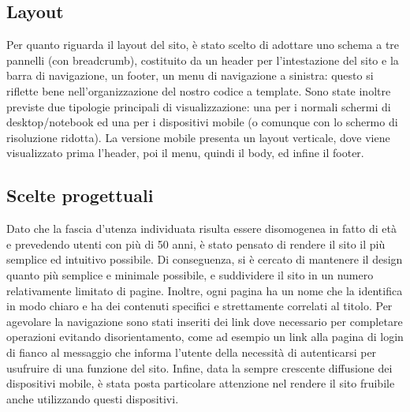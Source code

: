 \subsection{Layout}
Per quanto riguarda il layout del sito, è stato scelto di adottare uno schema a tre pannelli (con breadcrumb), costituito da un header per l’intestazione del sito e la barra di navigazione, un footer, un menu di navigazione a sinistra: questo si riflette bene nell'organizzazione del nostro codice a template.
Sono state inoltre previste due tipologie principali di visualizzazione: una per i normali schermi di desktop/notebook ed una per i dispositivi mobile (o comunque con lo schermo di risoluzione ridotta). \newline
La versione mobile presenta un layout verticale, dove viene visualizzato prima l'header, poi il menu, quindi il body, ed infine il footer.

\subsection{Scelte progettuali}
Dato che la fascia d'utenza individuata risulta essere disomogenea in fatto di età e prevedendo utenti con più di 50 anni, è stato pensato di rendere il sito il più semplice ed intuitivo possibile. Di conseguenza, si è cercato di mantenere il design quanto più semplice e minimale possibile, e suddividere il sito in un numero relativamente limitato di pagine. Inoltre, ogni pagina ha un nome che la identifica in modo chiaro e ha dei contenuti specifici e strettamente correlati al titolo. Per agevolare la navigazione sono stati inseriti dei link dove necessario per completare operazioni evitando disorientamento, come ad esempio un link alla pagina di login di fianco al messaggio che informa l'utente della necessità di autenticarsi per usufruire di una funzione del sito. \newline
Infine, data la sempre crescente diffusione dei dispositivi mobile, è stata posta particolare attenzione nel rendere il sito fruibile anche utilizzando questi dispositivi. 
	
